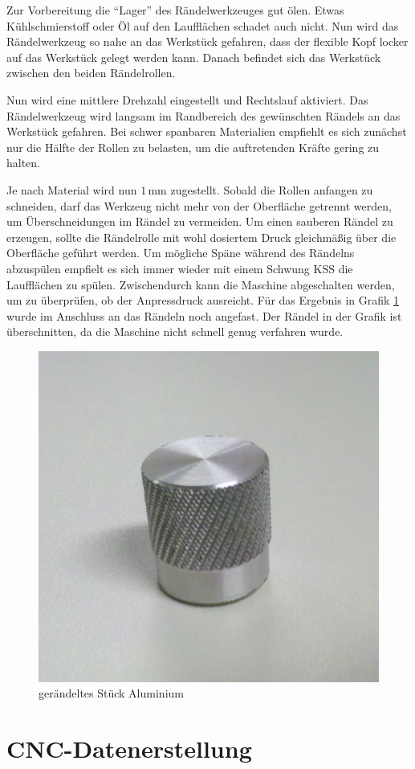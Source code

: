 \documentclass{\basedir/fablab-document}
\begin{document}
Zur Vorbereitung die \enquote{Lager} des Rändelwerkzeuges gut ölen.
Etwas Kühlschmierstoff oder Öl auf den Laufflächen schadet auch nicht. 
Nun wird das Rändelwerkzeug so nahe an das Werkstück gefahren, dass der flexible Kopf locker auf das Werkstück gelegt werden kann.
Danach befindet sich das Werkstück zwischen den beiden Rändelrollen.

Nun wird eine mittlere Drehzahl eingestellt und Rechtslauf aktiviert. 
Das Rändelwerkzeug wird langsam im Randbereich des gewünschten Rändels an das Werkstück gefahren. 
Bei schwer spanbaren Materialien empfiehlt es sich zunächst nur die Hälfte der Rollen zu belasten, um die auftretenden Kräfte gering zu halten.

Je nach Material wird nun $1$\,mm zugestellt. Sobald die Rollen anfangen zu schneiden, darf das Werkzeug nicht mehr von der Oberfläche getrennt werden, um Überschneidungen im Rändel zu vermeiden.
Um einen sauberen Rändel zu erzeugen, sollte die Rändelrolle mit wohl dosiertem Druck gleichmäßig über die Oberfläche geführt werden.
Um mögliche Späne während des Rändelns abzuspülen empfielt es sich immer wieder mit einem Schwung KSS die Laufflächen zu spülen.
Zwischendurch kann die Maschine abgeschalten werden, um zu überprüfen, ob der Anpressdruck ausreicht.
Für das Ergebnis in Grafik \ref{fig:raendel} wurde im Anschluss an das Rändeln noch angefast.
Der Rändel in der Grafik ist überschnitten, da die Maschine nicht schnell genug verfahren wurde.

\begin{figure}[hb]
\caption{gerändeltes Stück Aluminium}
\label{fig:raendel}
\centering
\includegraphics[width=.5\linewidth]{img/raendel}
\end{figure}
\newpage
\section{CNC-Datenerstellung}
\end{document}
